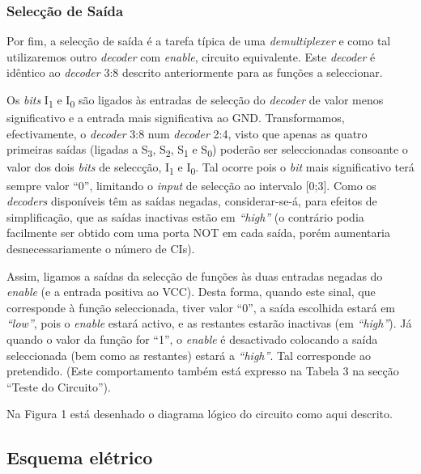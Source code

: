 \documentclass[a4paper,12pt]{article}
\begin{document}
\subsubsection{Selecção de Saída}
Por fim, a selecção de saída é a tarefa típica de uma {\it demultiplexer} 
e como tal utilizaremos outro {\it decoder} com {\it enable}, circuito 
equivalente. Este {\it decoder} é idêntico ao {\it decoder} 3:8 descrito 
anteriormente para as funções a seleccionar.
\par 
Os {\it bits} I\textsubscript{1} e I\textsubscript{0} são ligados às entradas 
de selecção do {\it decoder} de valor menos significativo e a entrada mais 
significativa ao GND. Transformamos, efectivamente, o {\it decoder} 3:8 num 
{\it decoder} 2:4, visto que apenas as quatro primeiras saídas (ligadas a 
S\textsubscript{3}, S\textsubscript{2}, S\textsubscript{1} e 
S\textsubscript{0}) poderão ser seleccionadas consoante o valor dos dois {\it 
bits} de seleccção, I\textsubscript{1} e I\textsubscript{0}. Tal ocorre pois 
o {\it bit} mais significativo terá sempre valor ``0'', limitando o {\it 
input} de selecção ao intervalo [0;3]. Como os {\it decoders} disponíveis 
têm as saídas negadas, considerar-se-á, para efeitos de simplificação, que 
as saídas inactivas estão em {\it ``high''} (o contrário podia facilmente 
ser obtido com uma porta NOT em cada saída, porém aumentaria 
desnecessariamente o número de CIs). 
\par
Assim, ligamos a saídas da selecção de funções às duas entradas negadas do {\it 
enable} (e a entrada positiva ao VCC). Desta forma, quando este sinal, que 
corresponde à função seleccionada, tiver valor ``0'', a saída escolhida 
estará em {\it ``low''}, pois o {\it enable} estará activo, e as restantes 
estarão inactivas (em {\it ``high''}). Já quando o valor da função for 
``1'', o {\it enable} é desactivado colocando a saída seleccionada (bem como 
as restantes) estará a {\it ``high''}. Tal corresponde ao pretendido. (Este 
comportamento também está expresso na Tabela 3 na secção ``Teste do 
Circuito'').
\par
Na Figura 1 está desenhado o diagrama lógico do circuito como aqui descrito.

\subsection{Esquema elétrico}
\end{document}
